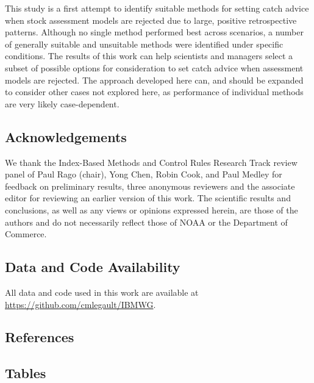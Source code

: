 \documentclass[
]{article}
\newlength{\cslhangindent}
\newlength{\cslentryspacingunit} %
\newenvironment{CSLReferences}[2] %
 {%
  \setlength{\parindent}{0pt}
  \ifodd #1
  \let\oldpar\par
  \def\par{\hangindent=\cslhangindent\oldpar}
  \fi
  \setlength{\parskip}{#2\cslentryspacingunit}
 }%
 {}
\begin{document}
This study is a first attempt to identify suitable methods for setting catch advice when stock assessment models are rejected due to large, positive retrospective patterns. Although no single method performed best across scenarios, a number of generally suitable and unsuitable methods were identified under specific conditions. The results of this work can help scientists and managers select a subset of possible options for consideration to set catch advice when assessment models are rejected. The approach developed here can, and should be expanded to consider other cases not explored here, as performance of individual methods are very likely case-dependent.

\hypertarget{acknowledgements}{%
\subsection{Acknowledgements}\label{acknowledgements}}

We thank the Index-Based Methods and Control Rules Research Track review panel of Paul Rago (chair), Yong Chen, Robin Cook, and Paul Medley for feedback on preliminary results, three anonymous reviewers and the associate editor for reviewing an earlier version of this work. The scientific results and conclusions, as well as any views or opinions expressed herein, are those of the authors and do not necessarily reflect those of NOAA or the Department of Commerce.

\hypertarget{data-and-code-availability}{%
\subsection{Data and Code Availability}\label{data-and-code-availability}}

All data and code used in this work are available at \url{https://github.com/cmlegault/IBMWG}.

\hypertarget{references}{%
\subsection{References}\label{references}}

\hypertarget{refs}{}
\begin{CSLReferences}{0}{0}
\end{CSLReferences}

\pagebreak

\hypertarget{tables}{%
\subsection{Tables}\label{tables}}
\end{document}
